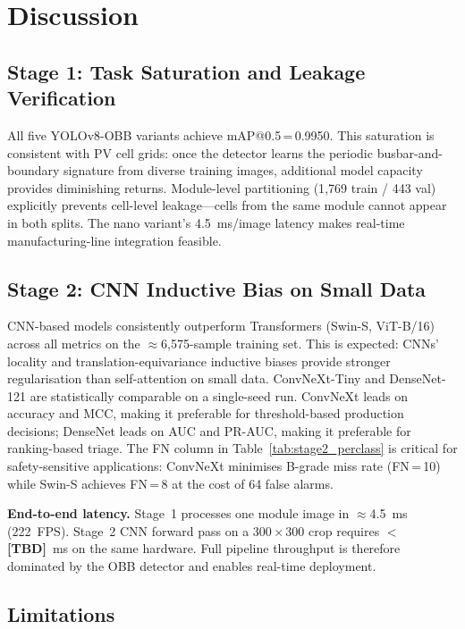 \documentclass[conference]{IEEEtran}
\begin{document}
\section{Discussion}
\label{sec:discussion}

\subsection{Stage 1: Task Saturation and Leakage Verification}

All five YOLOv8-OBB variants achieve mAP@0.5\,=\,0.9950. This saturation is consistent with PV cell grids: once the detector learns the periodic busbar-and-boundary signature from diverse training images, additional model capacity provides diminishing returns. Module-level partitioning (1{,}769 train / 443 val) explicitly prevents cell-level leakage---cells from the same module cannot appear in both splits. The nano variant's 4.5~ms/image latency makes real-time manufacturing-line integration feasible.

\subsection{Stage 2: CNN Inductive Bias on Small Data}

CNN-based models consistently outperform Transformers (Swin-S, ViT-B/16) across all metrics on the $\approx$6{,}575-sample training set. This is expected: CNNs' locality and translation-equivariance inductive biases provide stronger regularisation than self-attention on small data. ConvNeXt-Tiny and DenseNet-121 are statistically comparable on a single-seed run. ConvNeXt leads on accuracy and MCC, making it preferable for threshold-based production decisions; DenseNet leads on AUC and PR-AUC, making it preferable for ranking-based triage. The FN column in Table~\ref{tab:stage2_perclass} is critical for safety-sensitive applications: ConvNeXt minimises B-grade miss rate (FN\,=\,10) while Swin-S achieves FN\,=\,8 at the cost of 64 false alarms.

\textbf{End-to-end latency.} Stage~1 processes one module image in $\approx$4.5~ms (222~FPS). Stage~2 CNN forward pass on a $300\times300$ crop requires $<$\textbf{[TBD]}~ms on the same hardware. Full pipeline throughput is therefore dominated by the OBB detector and enables real-time deployment.

\subsection{Limitations}
\end{document}
